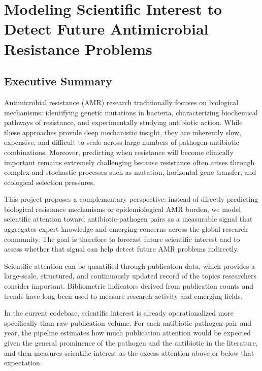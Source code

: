 \documentclass[
]{article}
\author{}
\date{}
\begin{document}
\section{Modeling Scientific Interest to Detect Future Antimicrobial
Resistance
Problems}\label{modeling-scientific-interest-to-detect-future-antimicrobial-resistance-problems}

\subsection{Executive Summary}\label{executive-summary}

Antimicrobial resistance (AMR) research traditionally focuses on
biological mechanisms: identifying genetic mutations in bacteria,
characterizing biochemical pathways of resistance, and experimentally
studying antibiotic action. While these approaches provide deep
mechanistic insight, they are inherently slow, expensive, and difficult
to scale across large numbers of pathogen-antibiotic combinations.
Moreover, predicting when resistance will become clinically important
remains extremely challenging because resistance often arises through
complex and stochastic processes such as mutation, horizontal gene
transfer, and ecological selection pressures.

This project proposes a complementary perspective: instead of directly
predicting biological resistance mechanisms or epidemiological AMR
burden, we model scientific attention toward antibiotic-pathogen pairs
as a measurable signal that aggregates expert knowledge and emerging
concerns across the global research community. The goal is therefore to
forecast future scientific interest and to assess whether that signal
can help detect future AMR problems indirectly.

Scientific attention can be quantified through publication data, which
provides a large-scale, structured, and continuously updated record of
the topics researchers consider important. Bibliometric indicators
derived from publication counts and trends have long been used to
measure research activity and emerging fields.

In the current codebase, scientific interest is already operationalized
more specifically than raw publication volume. For each
antibiotic-pathogen pair and year, the pipeline estimates how much
publication attention would be expected given the general prominence of
the pathogen and the antibiotic in the literature, and then measures
scientific interest as the excess attention above or below that
expectation.
\end{document}
